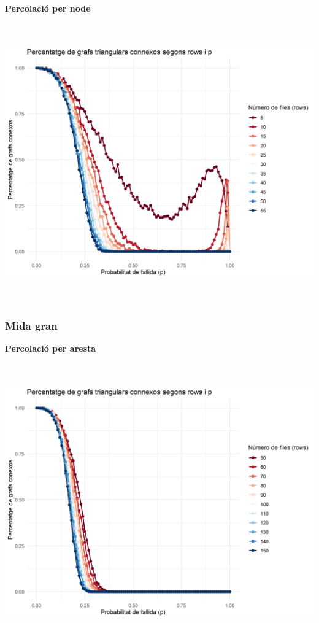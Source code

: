 \documentclass[a4paper]{article}
\begin{document}
	
	\textbf{Percolació per node}
	
	\includegraphics[height=12cm]{images/triangularN-5-55-1000}
	
	\subsubsection{Mida gran}
	
	\textbf{Percolació per aresta}
	
	
	\includegraphics[height=12cm]{images/triangularE-50-150}
	
\end{document}
